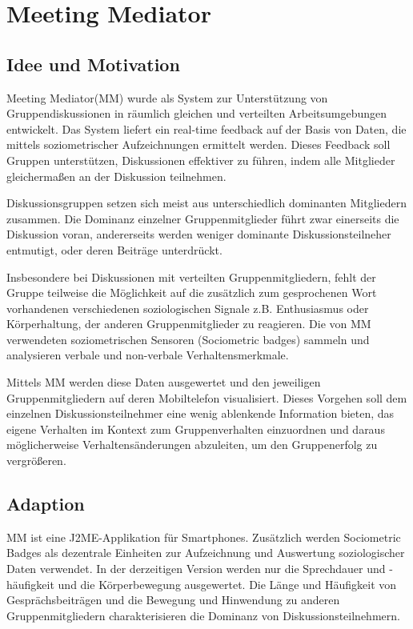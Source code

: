 \section{Meeting Mediator}

\subsection{Idee und Motivation}
Meeting Mediator(MM) \cite{KimChaHolPent2008} wurde als System zur
Un\-ter\-stütz\-ung von Gruppendiskussionen in räumlich gleichen und verteilten
Arbeitsumgebungen entwickelt. Das System liefert ein real-time feedback auf der
Basis von Daten, die mittels soziometrischer Aufzeichnungen ermittelt werden.
Dieses Feedback soll Gruppen unterstützen, Diskussionen effektiver zu führen,
indem alle Mitglieder gleichermaßen an der Diskussion teilnehmen.

Diskussionsgruppen setzen sich meist aus unterschiedlich dominanten Mitgliedern
zusammen. Die Dominanz einzelner Gruppenmitglieder führt zwar einerseits die
Diskussion voran, andererseits werden weniger dominante Diskussionsteilneher 
entmutigt, oder deren Beiträge un\-ter\-drückt.

Insbesondere bei Diskussionen mit verteilten Gruppenmitgliedern, fehlt der
Gruppe teilweise die Möglichkeit auf die zusätzlich zum gesprochenen Wort
vorhandenen verschiedenen soziologischen Signale z.B. Enthusiasmus oder
Körperhaltung, der anderen Gruppenmitglieder zu reagieren.
Die von MM verwendeten soziometrischen Sensoren (Sociometric badges)
\cite{MITbadge} sammeln und analysieren verbale und non-verbale
Verhaltensmerkmale.

Mittels MM werden diese Daten ausgewertet und den jeweiligen Gruppenmitgliedern
auf deren Mobiltelefon visualisiert. Dieses Vorgehen soll dem einzelnen
Diskussionsteilnehmer eine wenig ablenkende Information bieten, das eigene
Verhalten im Kontext zum Gruppenverhalten einzuordnen und daraus möglicherweise
Ver\-hal\-tens\-än\-de\-run\-gen abzuleiten, um den Gruppenerfolg zu
vergrößeren.

\subsection{Adaption}

MM ist eine J2ME-Applikation für Smartphones. Zu\-sätz\-lich werden Sociometric
Badges als dezentrale Einheiten zur Aufzeichnung und Auswertung
soziologischer Daten verwendet. In der derzeitigen Version werden nur die
Sprechdauer und -häufigkeit und die Körperbewegung ausgewertet.
Die Länge und Häufigkeit von Gesprächsbeiträgen und die Bewegung und Hinwendung
zu anderen Gruppenmitgliedern charakterisieren die Dominanz von
Diskussionsteilnehmern.

